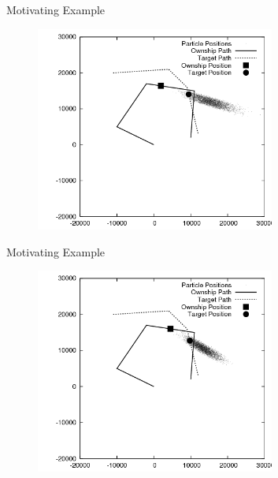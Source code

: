 \documentclass{beamer}
\begin{document}
\begin{frame}{Motivating Example}
\begin{figure}
\centering
\includegraphics[width=0.7\textwidth]{data/azimuth_only_2300.png}
\end{figure}
\end{frame}


\begin{frame}{Motivating Example}
\begin{figure}
\centering
\includegraphics[width=0.7\textwidth]{data/azimuth_only_2500.png}
\end{figure}
\end{frame}

\end{document}
